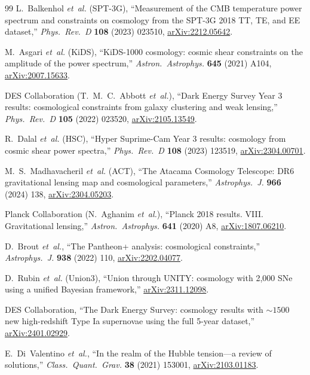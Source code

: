 \documentclass[11pt,a4paper]{article}
\theoremstyle{plain}
\theoremstyle{definition}
\theoremstyle{remark}
\begin{document}
\begin{thebibliography}{99}
L.~Balkenhol \textit{et~al.} (SPT-3G),
``Measurement of the CMB temperature power spectrum and constraints on
cosmology from the SPT-3G 2018 TT, TE, and EE dataset,''
\emph{Phys.\ Rev.\ D} \textbf{108} (2023) 023510,
\href{https://arxiv.org/abs/2212.05642}{arXiv:2212.05642}.

M.~Asgari \textit{et~al.} (KiDS),
``KiDS-1000 cosmology: cosmic shear constraints on the amplitude of the
power spectrum,''
\emph{Astron.\ Astrophys.} \textbf{645} (2021) A104,
\href{https://arxiv.org/abs/2007.15633}{arXiv:2007.15633}.

DES Collaboration (T.~M.~C.~Abbott \textit{et~al.}),
``Dark Energy Survey Year 3 results: cosmological constraints from
galaxy clustering and weak lensing,''
\emph{Phys.\ Rev.\ D} \textbf{105} (2022) 023520,
\href{https://arxiv.org/abs/2105.13549}{arXiv:2105.13549}.

R.~Dalal \textit{et~al.} (HSC),
``Hyper Suprime-Cam Year 3 results: cosmology from cosmic shear
power spectra,''
\emph{Phys.\ Rev.\ D} \textbf{108} (2023) 123519,
\href{https://arxiv.org/abs/2304.00701}{arXiv:2304.00701}.

M.~S.~Madhavacheril \textit{et~al.} (ACT),
``The Atacama Cosmology Telescope: DR6 gravitational lensing map
and cosmological parameters,''
\emph{Astrophys.\ J.} \textbf{966} (2024) 138,
\href{https://arxiv.org/abs/2304.05203}{arXiv:2304.05203}.

Planck Collaboration (N.~Aghanim \textit{et~al.}),
``Planck 2018 results. VIII. Gravitational lensing,''
\emph{Astron.\ Astrophys.} \textbf{641} (2020) A8,
\href{https://arxiv.org/abs/1807.06210}{arXiv:1807.06210}.

D.~Brout \textit{et~al.},
``The Pantheon+ analysis: cosmological constraints,''
\emph{Astrophys.\ J.} \textbf{938} (2022) 110,
\href{https://arxiv.org/abs/2202.04077}{arXiv:2202.04077}.

D.~Rubin \textit{et~al.} (Union3),
``Union through UNITY: cosmology with 2,000 SNe using a unified
Bayesian framework,''
\href{https://arxiv.org/abs/2311.12098}{arXiv:2311.12098}.

DES Collaboration,
``The Dark Energy Survey: cosmology results with $\sim 1500$
new high-redshift Type Ia supernovae using the full 5-year dataset,''
\href{https://arxiv.org/abs/2401.02929}{arXiv:2401.02929}.

E.~Di~Valentino \textit{et~al.},
``In the realm of the Hubble tension---a review of solutions,''
\emph{Class.\ Quant.\ Grav.} \textbf{38} (2021) 153001,
\href{https://arxiv.org/abs/2103.01183}{arXiv:2103.01183}.


\end{thebibliography}
\end{document}
